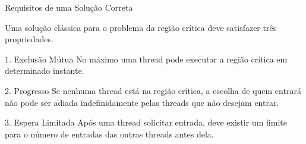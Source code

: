 \documentclass[aspectratio=169,11pt]{beamer}
\begin{document}

\begin{frame}{Requisitos de uma Solução Correta}

Uma solução clássica para o problema da região
crítica deve satisfazer três propriedades.

\vspace{0.3cm}

\begin{block}{1. Exclusão Mútua}
No máximo uma thread pode executar
a região crítica em determinado instante.
\end{block}

\begin{block}{2. Progresso}
Se nenhuma thread está na região crítica,
a escolha de quem entrará não pode ser
adiada indefinidamente pelas threads
que não desejam entrar.
\end{block}

\begin{block}{3. Espera Limitada}
Após uma thread solicitar entrada,
deve existir um limite para o número de
entradas das outras threads antes dela.
\end{block}

\end{frame}


\end{document}
